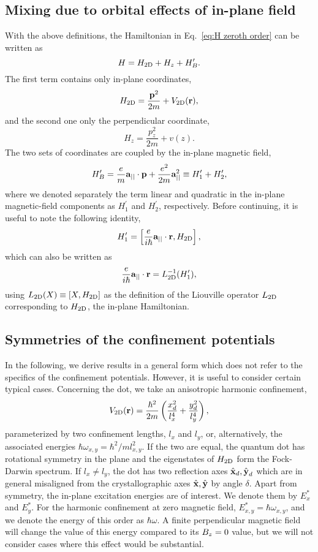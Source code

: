 \documentclass[aps,floatfix,twocolumn,showpacs,10pt,nofootinbib]{revtex4-1}
\newcommand{\be}{\begin{equation}}
\newcommand{\ee}{\end{equation}}
\begin{document}
\subsection{Mixing due to orbital effects of  in-plane field}

With the above definitions, the Hamiltonian in Eq.~\eqref{eq:H zeroth order} can be written as
\be
H=H_{\rm 2D} + H_z + H^\prime_B.
\ee
The first term contains only in-plane coordinates,
\be
H_{\rm 2D} = \frac{\Pin^2}{2m} +V_{\rm 2D}(\Rin),
\label{eq:H2D}
\ee
and the second one only the perpendicular coordinate,
\be
H_z=\frac{p_z^2}{2m} + v(z).
\label{eq:Hz}
\ee
The two sets of coordinates are coupled by the in-plane magnetic field,
\be
H^\prime_B = \frac{e}{m}\Ain \cdot \Pin + \frac{e^2}{2m} \Ain^2 \equiv H^\prime_1 + H^\prime_2,
\label{eq:Hmix}
\ee
where we denoted separately the term linear and quadratic in the in-plane magnetic-field components as $H^\prime_1$ and $H^\prime_2$, respectively. Before continuing, it is useful to note the following identity,
\be
H^\prime_1= \left[ \frac{e}{i\hbar} \Ain \cdot \Rin ,H_{\rm 2D}  \right],
\label{eq:Lm1}
\ee
which can also be written as
\be
\frac{e}{i\hbar} \Ain \cdot \Rin = L_{\rm 2D}^{-1} (H^\prime_1),
\ee
using $L_{\rm 2D}(X) \equiv [X,H_{\rm 2D}]$ as the definition of the Liouville operator $L_{\rm 2D}$ corresponding to $H_{\rm 2D}$, the in-plane Hamiltonian.

\subsection{Symmetries of the confinement potentials}

In the following, we derive results in a general form which does not refer to the specifics of the confinement potentials. However, it is useful to consider certain typical cases. Concerning the dot, we take an anisotropic harmonic confinement,
\be
V_{\rm 2D}(\Rin)
= \frac{\hbar^2}{2m} \left( \frac{ x_d^2}{l_x^4} + \frac{y_d^2}{l_y^4} \right),
\label{eq:V2D}
\ee
parameterized by two confinement lengths, $l_x$ and $l_y$, or, alternatively, the associated energies $\hbar \omega_{x,y} = \hbar^2/m l_{x,y}^2$. If the two are equal, the quantum dot has rotational symmetry in the plane and the eigenstates of $H_{\rm 2D}$ form the Fock-Darwin spectrum. If $l_x \neq l_y$, the dot has two reflection axes $\hat{\textbf{x}}_d, \hat{\textbf{y}}_d$ which are in general misaligned from the crystallographic axes $\hat{\textbf{x}}, \hat{\textbf{y}}$ by angle $\delta$. Apart from symmetry, the in-plane excitation energies are of interest. We denote them by $E^*_x$ and $E^*_y$. For the harmonic confinement at zero magnetic field, $E^*_{x,y}=\hbar \omega_{x,y}$, and we denote the energy of this order as $\hbar \omega$. A finite perpendicular magnetic field will change the value of this energy compared to its $B_z=0$ value,\cite{rebane1969,davies1985,schuh1985} but we will not consider cases where this effect would be substantial.
\end{document}
